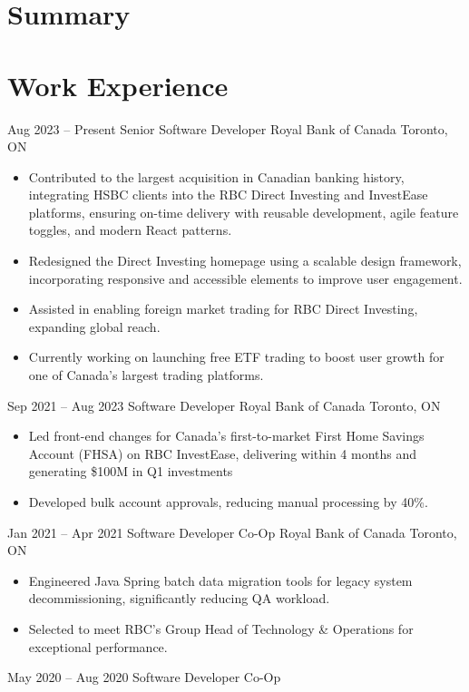 \documentclass[letterpaper]{moderncv}
\begin{document}
\makecvtitle

\section{Summary}

\section{Work Experience}
\cventry
{Aug 2023 -- Present}
{Senior Software Developer}
{Royal Bank of Canada}
{Toronto, ON}
{}
{\begin{itemize}%
	\item Contributed to the largest acquisition in Canadian banking history, integrating HSBC clients into the RBC Direct Investing and InvestEase platforms, ensuring on-time delivery with reusable development, agile feature toggles, and modern React patterns.
	\item Redesigned the Direct Investing homepage using a scalable design framework, incorporating responsive and accessible elements to improve user engagement.
	\item Assisted in enabling foreign market trading for RBC Direct Investing, expanding global reach.
	\item Currently working on launching free ETF trading to boost user growth for one of Canada’s largest trading platforms.
	\end{itemize}}
\cventry
{Sep 2021 -- Aug 2023}
{Software Developer}
{Royal Bank of Canada}
{Toronto, ON}
{}
{\begin{itemize}%
	\item Led front-end changes for Canada's first-to-market First Home Savings Account (FHSA) on RBC InvestEase, delivering within 4 months and generating \$100M in Q1 investments
	\item Developed bulk account approvals, reducing manual processing by 40\%.
	\end{itemize}}
\cventry
{Jan 2021 -- Apr 2021}
{Software Developer Co-Op}
{Royal Bank of Canada}
{Toronto, ON}
{}
{\begin{itemize}%
	\item Engineered Java Spring batch data migration tools for legacy system decommissioning, significantly reducing QA workload.
	\item Selected to meet RBC's Group Head of Technology \& Operations for exceptional performance.
	\end{itemize}}
\cventry
{May 2020 -- Aug 2020}
{Software Developer Co-Op}
\end{document}
